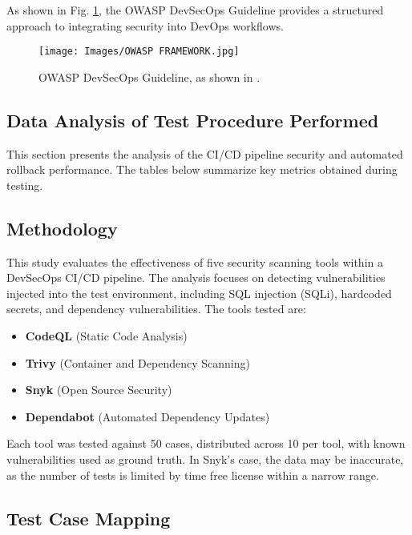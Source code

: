 \documentclass[conference]{IEEEtran}
\begin{document}
As shown in Fig. \ref{fig:OWASP FRAMEWORK}, the OWASP DevSecOps Guideline provides a structured approach to integrating security into DevOps workflows.

\begin{figure}[h!] \centering \texttt{[image: Images/OWASP FRAMEWORK.jpg]} \caption{OWASP DevSecOps Guideline, as shown in \cite{OWASP}.} \label{fig:OWASP FRAMEWORK} \end{figure}

\subsection{Data Analysis of Test Procedure Performed}

This section presents the analysis of the CI/CD pipeline security and automated rollback performance. The tables below summarize key metrics obtained during testing.

\subsection{Methodology}

This study evaluates the effectiveness of five security scanning tools within a DevSecOps CI/CD pipeline. The analysis focuses on detecting vulnerabilities injected into the test environment, including SQL injection (SQLi), hardcoded secrets, and dependency vulnerabilities. The tools tested are:

\begin{itemize}
    \item \textbf{CodeQL} (Static Code Analysis)
    \item \textbf{Trivy} (Container and Dependency Scanning)
    \item \textbf{Snyk} (Open Source Security)
    \item \textbf{Dependabot} (Automated Dependency Updates)
\end{itemize}

Each tool was tested against 50 cases, distributed across 10 per tool, with known vulnerabilities used as ground truth.
In Snyk's case, the data may be inaccurate, as the number of tests is limited by time free license within a narrow range.

\subsection{Test Case Mapping}
\end{document}
